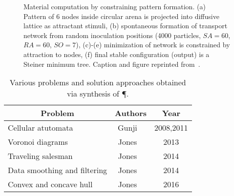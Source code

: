 			\begin{figure}
				\centering
				\newline
				
				
				\caption[Multi-agent \P - Evolution of agents]{Material computation by constraining pattern formation. (a) Pattern of $6$ nodes inside circular arena is projected into diffusive lattice as attractant stimuli, (b) spontaneous formation of transport network from random inoculation positions (4000 particles, $SA = 60$, $RA = 60$, $SO = 7$), (c)-(e) minimization of network is constrained by attraction to nodes, (f) final stable configuration (output) is a Steiner minimum tree. Caption and figure reprinted from~\cite{jones2016multi}.}
				\label{fig:agent_mst}
			\end{figure}

			\begin{table}
				\centering
				\begin{tabular}{@{} l *2c @{}}
				\toprule
				 \multicolumn{1}{c}{Problem}    & Authors  & Year   \\ 
				\midrule
				 Cellular atutomata & Gunji \etal~\cite{gunji2008minimal,gunji2011adaptive}  & 2008,2011 \\ 
				 Voronoi diagrams & Jones \etal~\cite{jones2015slime} & 2013 \\ 
				 Traveling salesman & Jones \etal~\cite{jones2014computation} & 2014 \\ 
				 Data smoothing and filtering & Jones \etal~\cite{jones2014material} & 2014 \\ 
				 Convex and concave hull & Jones \etal~\cite{jones2016multi} & 2016 \\ 
				
				


				\bottomrule
				\end{tabular}
				\caption[Computing by synthesis of \P]{Various problems and solution approaches obtained via synthesis of \P.}
				\label{tab:list_synthesize}
			\end{table}


